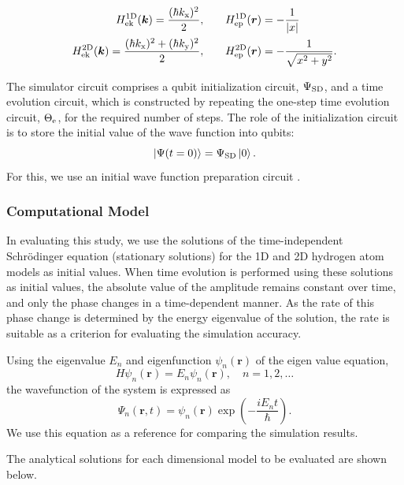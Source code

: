 \documentclass[aip-draft.tex]{subfiles}
\begin{document}
\begin{align}
   H_{\mathrm{ek}}^{\mathrm{1D}}(\bm{k}) = \frac{(\hbar k_{\mathrm{x}})^2}{2}, \qquad &
   H_{\mathrm{ep}}^{\mathrm{1D}}(\bm{r}) = -\frac{1}{{\left| x \right|}} \label{eq:HkHp1D}\\
   H_{\mathrm{ek}}^{\mathrm{2D}}(\bm{k}) = \frac{(\hbar k_{\mathrm{x}})^2 + (\hbar k_{\mathrm{y}})^2}{2}, \qquad &
   H_{\mathrm{ep}}^{\mathrm{2D}}(\bm{r}) = -\frac{1}{\sqrt{x^2+y^2}}. \label{eq:HkHp2D}
\end{align}

The simulator circuit comprises a qubit initialization circuit, $\Psi_{\mathrm{SD}}$, and a
time evolution circuit, which is constructed by repeating the one-step time
evolution circuit, $\Theta_{\mathrm{e}}$, for the required number of steps. The role of the
initialization circuit is to store the initial value of the wave function into
qubits:
\begin{equation}
\ket{\Psi(t=0)} = \Psi_{\mathrm{SD}} \ket{0}.
\end{equation}
For this, we use an initial wave function preparation circuit \cite[Sec.
2.2]{takahashi2024.doi:10.1021/acs.jctc.4c00708}.

\subsubsection{Computational Model}
In evaluating this study, we use the solutions of the time-independent
Schrödinger equation (stationary solutions) for the 1D and 2D hydrogen atom
models as initial values. When time evolution is performed using these solutions
as initial values, the absolute value of the amplitude remains constant over
time, and only the phase changes in a time-dependent manner. As the rate of this
phase change is determined by the energy eigenvalue of the solution, the rate is
suitable as a criterion for evaluating the simulation accuracy.

Using the eigenvalue $E_n$ and eigenfunction $\psi_n(\bm{r})$ of the eigen value
equation,
\begin{equation}
H\psi_n(\bm{r})=E_n\psi_n(\bm{r}),\quad n=1,2,\ldots
\end{equation}
the wavefunction of the system is expressed as
\begin{equation}
\Psi_n(\bm{r},t)=\psi_n(\bm{r})\exp\left(-\frac{iE_nt}{\hbar}\right).
\end{equation}
We use this equation as a reference for comparing the simulation results.

The analytical solutions for each dimensional model to be evaluated are shown below.
\end{document}
